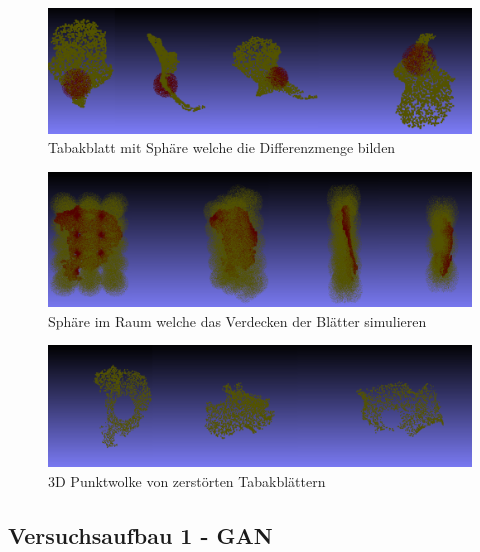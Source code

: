 \documentclass{llncs}
\begin{document}
\begin{figure}[htbp] 
	\centering
	\includegraphics[width=1.0\textwidth]{sphere1.png}
	\caption{Tabakblatt mit Sphäre welche die Differenzmenge bilden}
	\label{fig:Bild52}
\end{figure}

\begin{figure}[htbp] 
	\centering
	\includegraphics[width=1.0\textwidth]{allsphere.png}
	\caption{Sphäre im Raum welche das Verdecken der Blätter simulieren}
	\label{fig:Bild53}
\end{figure}

\begin{figure}[htbp] 
	\centering
	\includegraphics[width=1.0\textwidth]{training_destroyed.png}
	\caption{3D Punktwolke von zerstörten Tabakblättern}
	\label{fig:Bild54}
\end{figure}
\newpage


\subsection{Versuchsaufbau 1 - GAN}\label{sec:versuch1-aufbau}
\end{document}
